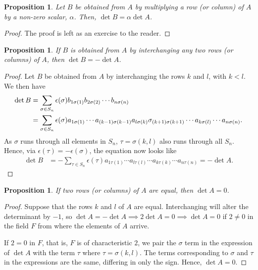 \documentclass[15pt,a4paper]{book}
\newtheorem{proposition}[theorem]{Proposition}
\theoremstyle{definition}
\begin{document}
\begin{proposition}
    Let $B$ be obtained from $A$ by multiplying a row (or column) of $A$ by a non-zero scalar, $\alpha$. Then, $\det{B} = \alpha \det{A}$.
\end{proposition}
\begin{proof}
    The proof is left as an exercise to the reader.
\end{proof}

\begin{proposition}
    If $B$ is obtained from $A$ by interchanging any two rows (or columns) of $A$, then $\det{B} = -\det{A}$.
\end{proposition}
\begin{proof}
    Let $B$ be obtained from $A$ by interchanging the rows $k$ and $l$, with $k < l$. We then have
    \begin{align}
        \det{B} &= \sum_{\sigma \in S_{n}} \epsilon(\sigma) b_{1 \sigma(1)} b_{2 \sigma(2)} \cdots b_{n \sigma(n)} \notag \\
        &= \sum_{\sigma \in S_{n}} \epsilon(\sigma) a_{1 \sigma(1)} \cdots a_{(k-1) \sigma(k-1)} a_{l \sigma(k)} \sigma_{(k+1) \sigma(k+1)} \cdots a_{k \sigma(l)} \cdots a_{n \sigma(n)}.
    \end{align}
    As $\sigma$ runs through all elements in $S_{n}$, $\tau = \sigma(k, l)$ also runs through all $S_{n}$. Hence, via $\epsilon(\tau) = -\epsilon(\sigma)$, the equation now looks like
    \begin{align}
        \det{B} &= -\sum_{\tau \in S_{n}} \epsilon(\tau) a_{1 \tau(1)} \cdots a_{l \tau(l)} \cdots a_{k \tau(k)} \cdots a_{n \tau(n)} = -\det{A}.
    \end{align}
\end{proof}

\begin{proposition}
    If two rows (or columns) of $A$ are equal, then $\det{A} = 0$.
\end{proposition}
\begin{proof}
    Suppose that the rows $k$ and $l$ of $A$ are equal. Interchanging will alter the determinant by $-1$, so $\det{A} = -\det{A} \implies 2 \det{A} = 0 \implies \det{A} = 0$ if $2 \neq 0$ in the field $F$ from where the elements of $A$ arrive.

    If $2 = 0$ in $F$, that is, $F$ is of characteristic $2$, we pair the $\sigma$ term in the expression of $\det {A}$ with the term $\tau$ where $\tau = \sigma (k, l)$. The terms corresponding to $\sigma$ and $\tau$ in the expressions are the same, differing in only the sign. Hence, $\det{A} = 0$.
\end{proof}
\end{document}

